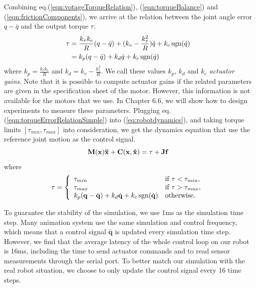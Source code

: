 Combining eq.(\ref{eqn:votageTorqueRelation}), (\ref{eqn:torqueBalance}) and (\ref{eqn:frictionComponents}), we arrive at the relation between the joint angle error $q-\bar{q}$ and the output torque $\tau$.
\begin{align}
\nonumber  \tau & = \frac{k_{\tau}k_e}{R}(q-\bar{q})+(k_v-\frac{k_{\tau}^2}{R})\dot{q}+k_c\operatorname{sgn}(\dot{q})\\
\nonumber & = k_p(q-\bar{q}) + k_d\dot{q} + k_c\operatorname{sgn}(\dot{q})\\
  \label{eqn:torqueErrorRelationSimple}
\end{align}
where $k_p=\frac{k_{\tau}k_e}{R}$ and $k_d=k_v-\frac{k_{\tau}^2}{R}$. We call these values $k_p$, $k_d$ and $k_c$ \emph{actuator gains}. Note that it is possible to compute actuator gains if the related parameters are given in the specification sheet of the motor. However, this information is not available for the motors that we use. In Chapter 6.6, we will show how to design experiments to measure these parameters. Plugging eq.(\ref{eqn:torqueErrorRelationSimple}) into (\ref{eq:robotdynamics}), and taking torque limits $[\tau_{min}, \tau_{max}]$ into consideration, we get the dynamics equation that use the reference joint motion as the control signal.
\begin{displaymath}
 \mathbf{M}(\mathbf{x})\mathbf{\ddot{x}}+\mathbf{C}(\mathbf{x},\mathbf{\dot{x}}) = \tau+\mathbf{Jf} \\
  \end{displaymath}
where 
\begin{displaymath}\tau =
  \left\{
    \begin{array}{ll}
      \tau_{min} & \text{if }\tau < \tau_{min},\\
      \tau_{max} & \text{if }\tau > \tau_{max},\\
      k_p(\mathbf{q}-\bar{\mathbf{q}}) + k_d\dot{\mathbf{q}} + k_c\operatorname{sgn}(\dot{\mathbf{q}}) & \text{otherwise.}\\
    \end{array}
  \right.
  \label{eqn:robotDynamicsControl}
\end{displaymath}

To guarantee the stability of the simulation, we use 1ms as the simulation time step. Many animation system use the same simulation and control frequency, which means that a control signal $\bar{\mathbf{q}}$ is updated every simulation time step. However, we find that the average latency of the whole control loop on our robot is 16ms, including the time to send actuator commands and to read sensor measurements through the serial port. To better match our simulation with the real robot situation, we choose to only update the control signal every 16 time steps.


